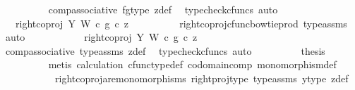 \begin{isabellebody}
\ \ \ \ \ \ \ \ \isamarkupfalse%
\ comp{\isacharunderscore}{\kern0pt}associative{}\ fg{\isacharunderscore}{\kern0pt}type\ z{\isacharunderscore}{\kern0pt}def\ \isamarkupfalse%
\ {\isacharparenleft}{\kern0pt}typecheck{\isacharunderscore}{\kern0pt}cfuncs{\isacharcomma}{\kern0pt}\ auto{\isacharparenright}{\kern0pt}\isanewline
\ \ \ \ \ \ \isamarkupfalse%
\ \isamarkupfalse%
\ {\isachardoublequoteopen}{\isachardot}{\kern0pt}{\isachardot}{\kern0pt}{\isachardot}{\kern0pt}\ {\isacharequal}{\kern0pt}\ {\isacharparenleft}{\kern0pt}right{\isacharunderscore}{\kern0pt}coproj\ Y\ W\ {\isasymcirc}\isactrlsub c\ g{\isacharparenright}{\kern0pt}\ {\isasymcirc}\isactrlsub c\ z{\isachardoublequoteclose}\isanewline
\ \ \ \ \ \ \ \ \isamarkupfalse%
\ right{\isacharunderscore}{\kern0pt}coproj{\isacharunderscore}{\kern0pt}cfunc{\isacharunderscore}{\kern0pt}bowtie{\isacharunderscore}{\kern0pt}prod\ type{\isacharunderscore}{\kern0pt}assms\ \isamarkupfalse%
\ auto\isanewline
\ \ \ \ \ \ \isamarkupfalse%
\ \isamarkupfalse%
\ {\isachardoublequoteopen}{\isachardot}{\kern0pt}{\isachardot}{\kern0pt}{\isachardot}{\kern0pt}\ {\isacharequal}{\kern0pt}\ right{\isacharunderscore}{\kern0pt}coproj\ Y\ W\ {\isasymcirc}\isactrlsub c\ g\ {\isasymcirc}\isactrlsub c\ z{\isachardoublequoteclose}\isanewline
\ \ \ \ \ \ \ \ \isamarkupfalse%
\ comp{\isacharunderscore}{\kern0pt}associative{}\ type{\isacharunderscore}{\kern0pt}assms{\isacharparenleft}{\kern0pt}{}{\isacharparenright}{\kern0pt}\ z{\isacharunderscore}{\kern0pt}def\ \isamarkupfalse%
\ {\isacharparenleft}{\kern0pt}typecheck{\isacharunderscore}{\kern0pt}cfuncs{\isacharcomma}{\kern0pt}\ auto{\isacharparenright}{\kern0pt}\isanewline
\ \ \ \ \ \ \isamarkupfalse%
\ \isamarkupfalse%
\ {\isacharquery}{\kern0pt}thesis\isanewline
\ \ \ \ \ \ \ \ \isamarkupfalse%
\ {\isacharparenleft}{\kern0pt}metis\ calculation\ cfunc{\isacharunderscore}{\kern0pt}type{\isacharunderscore}{\kern0pt}def\ codomain{\isacharunderscore}{\kern0pt}comp\ monomorphism{\isacharunderscore}{\kern0pt}def\ \isanewline
\ \ \ \ \ \ \ \ \ \ \ right{\isacharunderscore}{\kern0pt}coproj{\isacharunderscore}{\kern0pt}are{\isacharunderscore}{\kern0pt}monomorphisms\ right{\isacharunderscore}{\kern0pt}proj{\isacharunderscore}{\kern0pt}type\ type{\isacharunderscore}{\kern0pt}assms{\isacharparenleft}{\kern0pt}{}{\isacharparenright}{\kern0pt}\ y{\isacharunderscore}{\kern0pt}type{}\ z{\isacharunderscore}{\kern0pt}def{\isacharparenright}{\kern0pt}\isanewline

\end{isabellebody}
